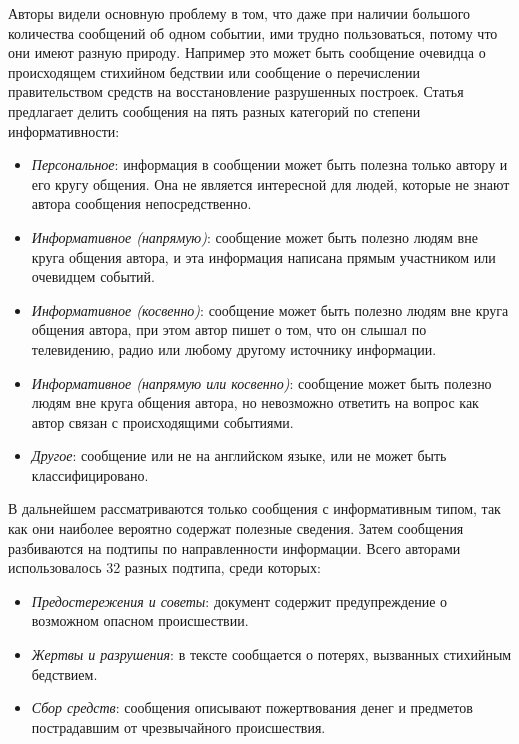 \documentclass[12pt, a4paper]{article}
\begin{document}
	Авторы видели основную проблему в том, что даже при наличии большого количества сообщений об одном событии, ими трудно пользоваться, потому что они имеют разную природу. Например это может быть сообщение очевидца о происходящем стихийном бедствии или сообщение о перечислении правительством средств на восстановление разрушенных построек. Статья предлагает делить сообщения на пять разных категорий по степени информативности:
	\begin{itemize}
	\item\emph{Персональное}:
	информация в сообщении может быть полезна только автору и его кругу общения. Она не является интересной для людей, которые не знают автора сообщения непосредственно.
	\item\emph{Информативное (напрямую)}:
	сообщение может быть полезно людям вне круга общения автора, и эта информация написана прямым участником или очевидцем событий.
	\item\emph{Информативное (косвенно)}:
	сообщение может быть полезно людям вне круга общения автора, при этом автор пишет о том, что он слышал по телевидению, радио или любому другому источнику информации.
	\item\emph{Информативное (напрямую или косвенно)}:
	сообщение может быть полезно людям вне круга общения автора, но невозможно ответить на вопрос как автор связан с происходящими событиями.
	\item\emph{Другое}:
	сообщение или не на английском языке, или не может быть классифицировано.
	\end{itemize}
	
	В дальнейшем рассматриваются только сообщения с информативным типом, так как они наиболее вероятно содержат полезные сведения. Затем сообщения разбиваются на подтипы по направленности информации. Всего авторами использовалось 32 разных подтипа, среди которых:
	\begin{itemize}
	\item\emph{Предостережения и советы}: документ содержит предупреждение о возможном опасном происшествии.
	\item\emph{Жертвы и разрушения}: в тексте сообщается о потерях, вызванных стихийным бедствием.
	\item\emph{Сбор средств}: сообщения описывают пожертвования денег и предметов пострадавшим от чрезвычайного происшествия.
	\end{itemize}
	
\end{document}
